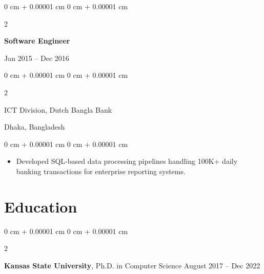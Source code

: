 \documentclass[10pt, letterpaper]{article}
\newenvironment{highlights}{
    \begin{itemize}[
        topsep=0.10 cm,
        parsep=0.10 cm,
        partopsep=0pt,
        itemsep=0pt,
        leftmargin=0 cm + 10pt
    ]
}{
    \end{itemize}
} %
\newenvironment{onecolentry}{
    \begin{adjustwidth}{
        0 cm + 0.00001 cm
    }{
        0 cm + 0.00001 cm
    }
}{
    \end{adjustwidth}
} %
\newenvironment{twocolentry}[2][]{
    \onecolentry
    \def\secondColumn{#2}
    \setcolumnwidth{\fill, 4.5 cm}
    \begin{paracol}{2}
}{
    \switchcolumn \raggedleft \secondColumn
    \end{paracol}
    \endonecolentry
} %
\begin{document}
    \vspace{0.1 cm}
    \begin{twocolentry}{Jan 2015 -- Dec 2016}
        \textbf{Software Engineer}
    \end{twocolentry}
    \begin{twocolentry}{Dhaka, Bangladesh}
       ICT Division, Dutch Bangla Bank
    \end{twocolentry}
    
    \begin{onecolentry}
        \begin{highlights}
            \item Developed SQL-based data processing pipelines handling 100K+ daily banking transactions for enterprise reporting systems.
        \end{highlights}
    \end{onecolentry}

    \vspace{-1.25mm}

\section{Education}
    
        \begin{twocolentry}{
            August 2017 – Dec 2022
        }
            \textbf{Kansas State University}, Ph.D. in Computer Science\end{twocolentry}

\end{document}

